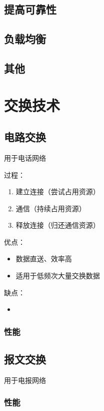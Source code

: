 \subsection{提高可靠性}


\subsection{负载均衡}


\subsection{其他}


\section{交换技术}

\subsection{电路交换}
用于电话网络

过程：\begin{enumerate}
    \item 建立连接（尝试占用资源）
    \item 通信（持续占用资源）
    \item 释放连接（归还通信资源）
\end{enumerate}

优点：\begin{itemize}
    \item 数据直送、效率高
    \item 适用于低频次大量交换数据
\end{itemize}

缺点：\begin{itemize}
    \item 
\end{itemize}

\subsubsection{性能}


\subsection{报文交换}
用于电报网络

\subsubsection{性能}



